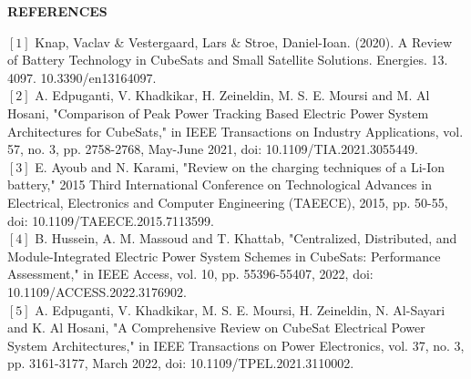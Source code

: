 \thispagestyle{plain}

\begin{center}
	\Large {\bf \uppercase{References}}
\end{center}

\vspace{3\baselineskip}
\noindent
\setlength\parindent{0pt}
$[1]$ Knap, Vaclav & Vestergaard, Lars & Stroe, Daniel-Ioan. (2020). A Review of Battery Technology in CubeSats and Small Satellite Solutions. Energies. 13. 4097. 10.3390/en13164097.
\vspace{3.5pt}
\\ 
$[2]$ A. Edpuganti, V. Khadkikar, H. Zeineldin, M. S. E. Moursi and M. Al Hosani, "Comparison of Peak Power Tracking Based Electric Power System Architectures for CubeSats," in IEEE Transactions on Industry Applications, vol. 57, no. 3, pp. 2758-2768, May-June 2021, doi: 10.1109/TIA.2021.3055449.
\vspace{3.5pt}
\\ 
$[3]$ E. Ayoub and N. Karami, "Review on the charging techniques of a Li-Ion battery," 2015 Third International Conference on Technological Advances in Electrical, Electronics and Computer Engineering (TAEECE), 2015, pp. 50-55, doi: 10.1109/TAEECE.2015.7113599.
\vspace{3.5pt}
\\ 
$[4]$ B. Hussein, A. M. Massoud and T. Khattab, "Centralized, Distributed, and Module-Integrated Electric Power System Schemes in CubeSats: Performance Assessment," in IEEE Access, vol. 10, pp. 55396-55407, 2022, doi: 10.1109/ACCESS.2022.3176902.
\vspace{3.5pt}
\\ 
$[5]$ A. Edpuganti, V. Khadkikar, M. S. E. Moursi, H. Zeineldin, N. Al-Sayari and K. Al Hosani, "A Comprehensive Review on CubeSat Electrical Power System Architectures," in IEEE Transactions on Power Electronics, vol. 37, no. 3, pp. 3161-3177, March 2022, doi: 10.1109/TPEL.2021.3110002.
